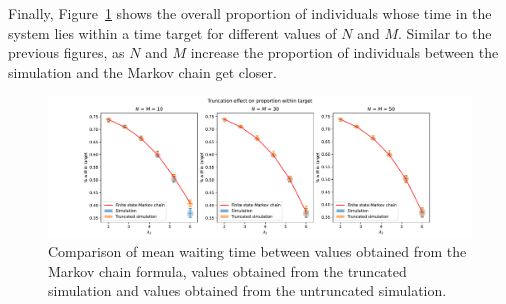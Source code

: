 Finally, Figure~\ref{fig:markov_vs_des_proportion_within_time_comparison_overall}
shows the overall proportion of individuals whose time in the system lies within
a time target for different values of \(N\) and \(M\).
Similar to the previous figures, as \(N\) and \(M\) increase the proportion of
individuals between the simulation and the Markov chain get closer.


\begin{figure}[H]
    \includegraphics[width=\textwidth]{chapters/03_queueing_model/img/numeric_results_and_timings/truncation_effect/proportion/demo.pdf}
    \caption{
        Comparison of mean waiting time between values obtained from the Markov 
        chain formula, values obtained from the truncated simulation and values
        obtained from the untruncated simulation.
    }
    \label{fig:markov_vs_des_proportion_within_time_comparison_overall}
\end{figure}

